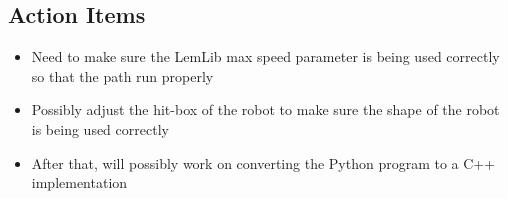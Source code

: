 \subsection{Action Items}
\begin{itemize}
    \item Need to make sure the LemLib max speed parameter is being used correctly so that the path run properly
    \item Possibly adjust the hit-box of the robot to make sure the shape of the robot is being used correctly
    \item After that, will possibly work on converting the Python program to a C++ implementation
\end{itemize}
